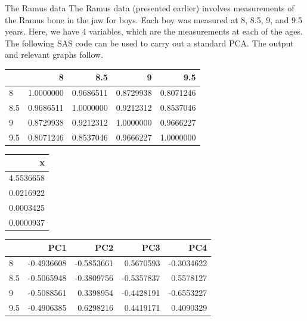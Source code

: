 \documentclass[
  9pt,
  ignorenonframetext,
]{beamer}
\begin{document}
\begin{frame}{The Ramus data}
\protect\hypertarget{the-ramus-data}{}
The Ramus data (presented earlier) involves measurements of the Ramus
bone in the jaw for boys. Each boy was measured at 8, 8.5, 9, and 9.5
years. Here, we have 4 variables, which are the measurements at each of
the ages. The following SAS code can be used to carry out a standard
PCA. The output and relevant graphs follow.

\tiny

\begin{longtable}[]{@{}lrrrr@{}}
\toprule
& 8 & 8.5 & 9 & 9.5\tabularnewline
\midrule
\endhead
8 & 1.0000000 & 0.9686511 & 0.8729938 & 0.8071246\tabularnewline
8.5 & 0.9686511 & 1.0000000 & 0.9212312 & 0.8537046\tabularnewline
9 & 0.8729938 & 0.9212312 & 1.0000000 & 0.9666227\tabularnewline
9.5 & 0.8071246 & 0.8537046 & 0.9666227 & 1.0000000\tabularnewline
\bottomrule
\end{longtable}

\begin{longtable}[]{@{}r@{}}
\toprule
x\tabularnewline
\midrule
\endhead
4.5536658\tabularnewline
0.0216922\tabularnewline
0.0003425\tabularnewline
0.0000937\tabularnewline
\bottomrule
\end{longtable}

\begin{longtable}[]{@{}lrrrr@{}}
\toprule
& PC1 & PC2 & PC3 & PC4\tabularnewline
\midrule
\endhead
8 & -0.4936608 & -0.5853661 & 0.5670593 & -0.3034622\tabularnewline
8.5 & -0.5065948 & -0.3809756 & -0.5357837 & 0.5578127\tabularnewline
9 & -0.5088561 & 0.3398954 & -0.4428191 & -0.6553227\tabularnewline
9.5 & -0.4906385 & 0.6298216 & 0.4419171 & 0.4090329\tabularnewline
\bottomrule
\end{longtable}

\tiny
\end{frame}
\end{document}

